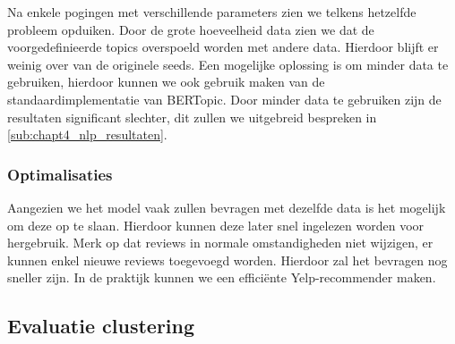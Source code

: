Na enkele pogingen met verschillende parameters zien we telkens hetzelfde probleem opduiken. Door de grote hoeveelheid data zien we dat de voorgedefinieerde topics overspoeld worden met andere data. Hierdoor blijft er weinig over van de originele seeds. Een mogelijke oplossing is om minder data te gebruiken, hierdoor kunnen we ook gebruik maken van de standaardimplementatie van BERTopic. Door minder data te gebruiken zijn de resultaten significant slechter, dit zullen we uitgebreid bespreken in \autoref{sub:chapt4_nlp_resultaten}.

\subsubsection{Optimalisaties}
Aangezien we het model vaak zullen bevragen met dezelfde data is het mogelijk om deze op te slaan. Hierdoor kunnen deze later snel ingelezen worden voor hergebruik. Merk op dat reviews in normale omstandigheden niet wijzigen, er kunnen enkel nieuwe reviews toegevoegd worden. Hierdoor zal het bevragen nog sneller zijn. In de praktijk kunnen we een efficiënte Yelp-recommender maken.

\subsection{Evaluatie clustering}
\label{sub:chapt4_eval_clustering}




